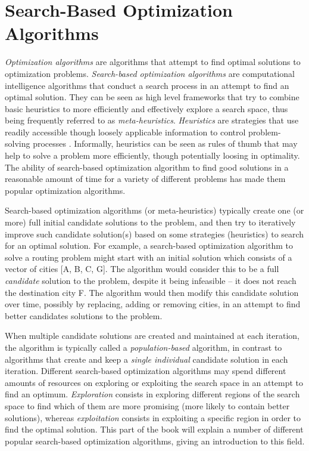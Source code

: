 \section{Search-Based Optimization Algorithms}
\label{sec:alg}

\textit{Optimization algorithms} are algorithms that attempt to find optimal solutions to optimization problems. \textit{Search-based optimization algorithms} are computational intelligence algorithms that conduct a search process in an attempt to find an optimal solution. They can be seen as high level frameworks that try to combine basic heuristics to more efficiently and effectively explore a search space, thus being frequently referred to as \textit{meta-heuristics}. \textit{Heuristics} are strategies that use readily accessible though loosely applicable information to control problem-solving processes \cite{heuristics}. Informally, heuristics can be seen as rules of thumb that may help to solve a problem more efficiently, though potentially loosing in optimality. The ability of search-based optimization algorithm to find good solutions in a reasonable amount of time for a variety of different problems has made them popular optimization algorithms. 

Search-based optimization algorithms (or meta-heuristics) typically create one (or more) full initial candidate solutions to the problem, and then try to iteratively improve such candidate solution(s) based on some strategies (heuristics) to search for an optimal solution. For example, a search-based optimization algorithm to solve a routing problem might start with an initial solution which consists of a vector of cities [A, B, C, G]. The algorithm would consider this to be a full \textit{candidate} solution to the problem, despite it being infeasible -- it does not reach the destination city F. The algorithm would then modify this candidate solution over time, possibly by replacing, adding or removing cities, in an attempt to find better candidates solutions to the problem. 

When multiple candidate solutions are created and maintained at each iteration, the algorithm is typically called a \textit{population-based} algorithm, in contrast to algorithms that create and keep a \textit{single individual} candidate solution in each iteration. Different search-based optimization algorithms may spend different amounts of resources on exploring or exploiting the search space in an attempt to find an optimum. \textit{Exploration} consists in exploring different regions of the search space to find which of them are more promising (more likely to contain better solutions), whereas \textit{exploitation} consists in exploiting a specific region in order to find the optimal solution. This part of the book will explain a number of different popular search-based optimization algorithms, giving an introduction to this field.



